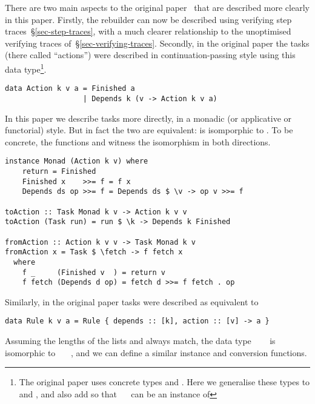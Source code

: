 There are two main
aspects to the original \Shake paper~\cite{mitchell2012shake} that are described
more clearly in this paper. Firstly, the rebuilder can now be described using
verifying step traces~\S\ref{sec-step-traces}, with a much clearer relationship
to the unoptimised verifying traces of~\S\ref{sec-verifying-traces}. Secondly,
in the original paper the tasks (there called ``actions'')
were described in continuation-passing style using this data type\footnote{
The original paper uses concrete types  and . Here we
generalise these types to  and , and also add  so that
~~ can be an instance of }.
\vspace{1mm}
\begin{verbatim}
data Action k v a = Finished a
                  | Depends k (v -> Action k v a)
\end{verbatim}
\vspace{1mm}
\noindent
In this paper we describe tasks more directly, in a monadic (or applicative or functorial)
style. But in fact the two are equivalent:  is
isomporphic to .
To be concrete, the functions  and  witness the
isomorphism in both directions.
\vspace{1mm}
\begin{verbatim}
instance Monad (Action k v) where
    return = Finished
    Finished x    >>= f = f x
    Depends ds op >>= f = Depends ds $ \v -> op v >>= f

toAction :: Task Monad k v -> Action k v v
toAction (Task run) = run $ \k -> Depends k Finished

fromAction :: Action k v v -> Task Monad k v
fromAction x = Task $ \fetch -> f fetch x
  where
    f _     (Finished v  ) = return v
    f fetch (Depends d op) = fetch d >>= f fetch . op
\end{verbatim}
\vspace{1mm}

\noindent
Similarly, in the original paper \Make tasks were described as equivalent to

\vspace{1mm}
\begin{verbatim}
data Rule k v a = Rule { depends :: [k], action :: [v] -> a }
\end{verbatim}
\vspace{1mm}
\noindent
Assuming the lengths of the lists \hs{[@@k]} and \hs{[@@v]} always match, the
data type ~~~ is isomorphic to
~~~, and we can define a similar
 instance and conversion functions.

